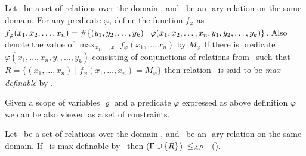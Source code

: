 \begin{defi}\label{def:max}
Let \mrelset\ be a set of relations over the domain \mD,
and \mR\ be an \mn-ary relation on the same domain. 
For any predicate \(\varphi\), define the function
\(f_\varphi\) as \(f_\varphi(x_1,x_2,\dotsc,x_n)=\#\{{(y_1,y_2,\dotsc,y_k) \mid
\varphi(x_1,x_2,\dotsc,x_n,y_1,y_2,\dotsc,y_k)}\}\)\@. Also denote the value of
\(\max_{x_1,\dotsc,x_n} f_\varphi(x_1,\dotsc,x_n)\) by \(M_\varphi\)
If there is predicate \(\varphi(x_1,\dotsc,x_n,y_1,\dotsc,y_k)\) 
consisting of conjunctions of relations from \mrelset\ such that
 \(R=\{(x_1,\dotsc,x_n) \mid f_\varphi(x_1,\dotsc,x_n) = M_\varphi\}\) then
relation \mR\ is said to be \emph{max-definable} by \mrelset\@.
\end{defi} 

Given a scope of variables \(\varrho\) and a predicate \(\varphi\) expressed as above definition
\(\varphi\) we can be also viewed as a set of constraints.

\begin{theorem}[Maximization]\label{theo:max}
Let \mrelset\ be a set of relations over the domain \mD,
and \mR\ be an \mn-ary relation on the same domain. 
If \mR\ is max-definable by \mrelset\ then \ccsp(\(\Gamma \cup \{{R}\}\))~\(\le_{AP}\)~
\ccsp(\mrelset)\@.
\end{theorem}

